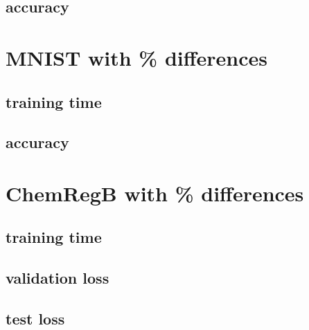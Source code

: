 \subsection{accuracy}







\section{MNIST with \% differences}
\subsection{training time}






\subsection{accuracy}






\section{ChemRegB with \% differences}
\subsection{training time}



\subsection{validation loss}



\subsection{test loss}


